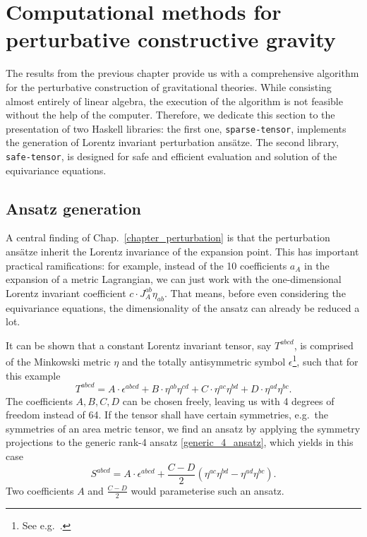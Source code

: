 \chapter{Computational methods for perturbative constructive gravity}
\label{chapter_computational_methods}

The results from the previous chapter provide us with a comprehensive algorithm for the perturbative construction of gravitational theories. While consisting almost entirely of linear algebra, the execution of the algorithm is not feasible without the help of the computer. Therefore, we dedicate this section to the presentation of two Haskell libraries: the first one, \texttt{sparse-tensor}, implements the generation of Lorentz invariant perturbation ansätze. The second library, \texttt{safe-tensor}, is designed for safe and efficient evaluation and solution of the equivariance equations.

\section{Ansatz generation}
A central finding of Chap.~\ref{chapter_perturbation} is that the perturbation ansätze inherit the Lorentz invariance of the expansion point. This has important practical ramifications: for example, instead of the 10 coefficients $a_A$ in the expansion of a metric Lagrangian, we can just work with the one-dimensional Lorentz invariant coefficient $c\cdot J_A^{ab} \eta_{ab}$. That means, before even considering the equivariance equations, the dimensionality of the ansatz can already be reduced a lot.

It can be shown that a constant Lorentz invariant tensor, say $T^{abcd}$, is comprised of the Minkowski metric $\eta$ and the totally antisymmetric symbol $\epsilon$\footnote{See e.g.~\cite{Aslaksen_1995,Procesi_1976}.}, such that for this example
\begin{equation}\label{generic_4_ansatz}
  T^{abcd} = A \cdot \epsilon^{abcd} + B \cdot \eta^{ab} \eta^{cd} + C \cdot \eta^{ac} \eta^{bd} + D \cdot \eta^{ad} \eta^{bc}.
\end{equation}
The coefficients $A,B,C,D$ can be chosen freely, leaving us with 4 degrees of freedom instead of 64. If the tensor shall have certain symmetries, e.g.\ the symmetries of an area metric tensor, we find an ansatz by applying the symmetry projections to the generic rank-4 ansatz \eqref{generic_4_ansatz}, which yields in this case
\begin{equation}
  S^{abcd} = A \cdot \epsilon^{abcd} + \frac{C - D}{2} \left( \eta^{ac}\eta^{bd} - \eta^{ad}\eta^{bc} \right).
\end{equation}
Two coefficients $A$ and $\frac{C-D}{2}$ would parameterise such an ansatz.

